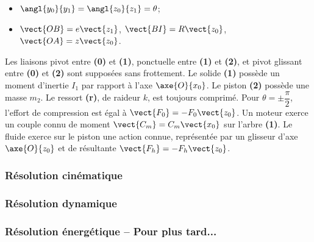 \begin{itemize}
\item $\angl{y_0}{y_1}=\angl{z_0}{z_1}=\theta$;
\item $\vect{OB}=e\vect{z_1}$, $\vect{BI}=R\vect{z_0}$, $\vect{OA}=z\vect{z_0}$. 
\end{itemize} 	 	 		
 
Les liaisons pivot entre \textbf{(0)} et \textbf{(1)}, ponctuelle entre \textbf{(1)} et \textbf{(2)}, et pivot glissant entre \textbf{(0)} et \textbf{(2)} sont supposées sans frottement.
Le solide \textbf{(1)} possède un moment d’inertie $I_1$ par rapport à l'axe $\axe{O}{x_0}$. Le piston \textbf{(2)} possède une masse $m_2$.
Le ressort \textbf{(r)}, de raideur $k$, est toujours comprimé. Pour $\theta = \pm \dfrac{\pi}{2}$, l'effort de compression est égal à $\vect{F_0}=-F_0\vect{z_0}$.
Un moteur exerce un couple connu de moment $\vect{C_m}=C_m\vect{x_0}$ sur l'arbre \textbf{(1)}. Le fluide exerce sur le piston une action connue, représentée par un glisseur d'axe $\axe{O}{z_0}$ et de résultante $\vect{F_h}=-F_h{\vect{z_0}}$.

\subsubsection*{Résolution cinématique}

\subsubsection*{Résolution dynamique}




\subsubsection*{Résolution énergétique -- Pour plus tard...}



